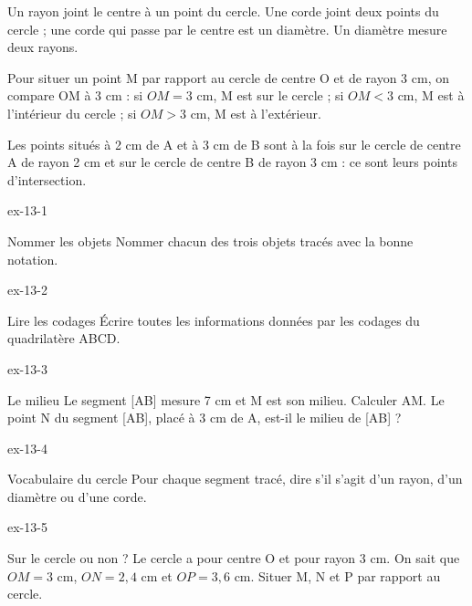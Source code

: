 \begin{definition}Un rayon joint le centre à un point du cercle. Une corde joint deux points du cercle ; une corde qui passe par le centre est un diamètre. Un diamètre mesure deux rayons.\end{definition}
\begin{savoirfaire}Pour situer un point M par rapport au cercle de centre O et de rayon 3 cm, on compare OM à 3 cm : si $OM=3$ cm, M est sur le cercle ; si $OM<3$ cm, M est à l’intérieur du cercle ; si $OM>3$ cm, M est à l’extérieur.\end{savoirfaire}
\begin{exemple}Les points situés à 2 cm de A et à 3 cm de B sont à la fois sur le cercle de centre A de rayon 2 cm et sur le cercle de centre B de rayon 3 cm : ce sont leurs points d’intersection.\end{exemple}

\clearpage{}
\begin{blocLivre}{ex-13-1}\begin{exercice}[1]{Nommer les objets}
Nommer chacun des trois objets tracés avec la bonne notation.
\label{fig-ex-13-1}
\end{exercice}\end{blocLivre}
\begin{blocLivre}{ex-13-2}\begin{exercice}[1]{Lire les codages}
Écrire toutes les informations données par les codages du quadrilatère ABCD.
\label{fig-ex-13-2}
\end{exercice}\end{blocLivre}
\begin{blocLivre}{ex-13-3}\begin{exercice}[1]{Le milieu}
Le segment [AB] mesure 7 cm et M est son milieu. Calculer AM. Le point N du segment [AB], placé à 3 cm de A, est-il le milieu de [AB] ?
\label{fig-ex-13-3}
\end{exercice}\end{blocLivre}
\begin{blocLivre}{ex-13-4}\begin{exercice}[1]{Vocabulaire du cercle}
Pour chaque segment tracé, dire s’il s’agit d’un rayon, d’un diamètre ou d’une corde.
\label{fig-ex-13-4}
\end{exercice}\end{blocLivre}
\begin{blocLivre}{ex-13-5}\begin{exercice}[1]{Sur le cercle ou non ?}
Le cercle a pour centre O et pour rayon 3 cm. On sait que $OM=3$ cm, $ON=2{,}4$ cm et $OP=3{,}6$ cm. Situer M, N et P par rapport au cercle.
\label{fig-ex-13-5}
\end{exercice}\end{blocLivre}

